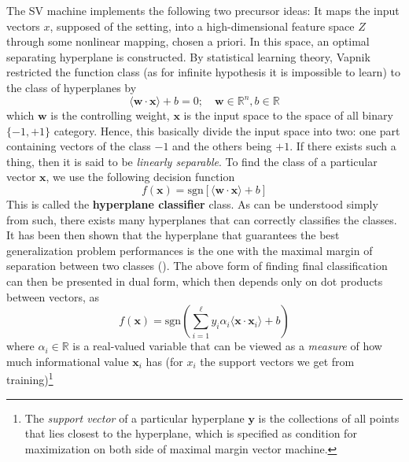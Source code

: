 \documentclass[10pt]{article} %
\begin{document}
The SV machine implements the following two precursor ideas: It maps the input vectors $x$, supposed of the setting, into a high-dimensional feature space $Z$ through some nonlinear mapping, chosen a priori. In this space, an optimal separating hyperplane is constructed. By statistical learning theory, Vapnik restricted the function class (as for infinite hypothesis it is impossible to learn) to the class of hyperplanes by 
\begin{equation}
    \langle \mathbf{w}\cdot \mathbf{x} \rangle + b = 0 ; \quad \mathbf{w}\in \mathbb{R}^{n} , b\in \mathbb{R}
\end{equation}
which $\mathbf{w}$ is the controlling weight, $\mathbf{x}$ is the input space to the space of all binary $\{-1,+1\}$ category. Hence, this basically divide the input space into two: one part containing vectors of the class $-1$ and the others being $+1$. If there exists such a thing, then it is said to be \textit{linearly separable}. To find the class of a particular vector $\mathbf{x}$, we use the following decision function 
\begin{equation}
    f(\mathbf{x}) = \mathrm{sgn}[\langle \mathbf{w}\cdot \mathbf{x}\rangle+ b]
\end{equation}
This is called the \textbf{hyperplane classifier} class. As can be understood simply from such, there exists many hyperplanes that can correctly classifies the classes. It has been then shown that the hyperplane that guarantees the best generalization problem performances is the one with the maximal margin of separation between two classes (\cite{Cristianini2000AnIT}). The above form of finding final classification can then be presented in dual form, which then depends only on dot products between vectors, as 
\begin{equation}
    f(\mathbf{x}) = \mathrm{sgn}\left(\sum^{\ell}_{i=1} y_{i}\alpha_{i} \langle \mathbf{x}\cdot \mathbf{x}_{i} \rangle+ b\right)
\end{equation} where $\alpha_{i}\in \mathbb{R}$ is a real-valued variable that can be viewed as a \textit{measure} of how much informational value $\mathbf{x}_{i}$ has (for $x_{i}$ the support vectors we get from training)\footnote{The \textit{support vector} of a particular hyperplane $\mathbf{y}$ is the collections of all points that lies closest to the hyperplane, which is specified as condition for maximization on both side of maximal margin vector machine.}
\end{document}
